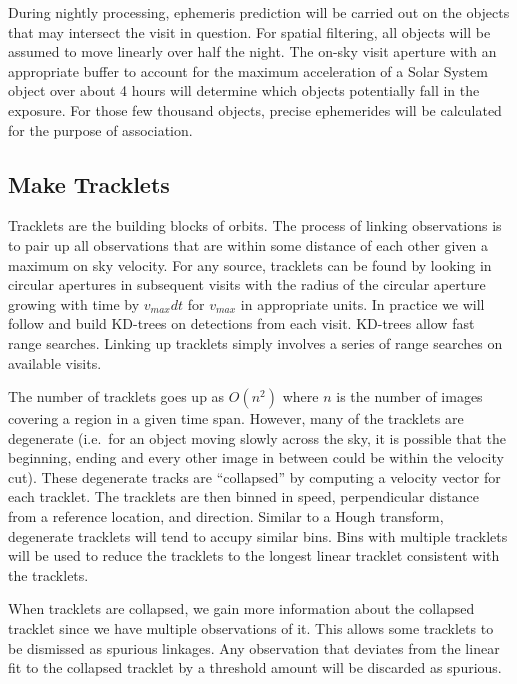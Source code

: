 During nightly processing, ephemeris prediction will be carried out on the objects that may intersect the visit in question.  For spatial filtering, all objects will be assumed to move linearly over half the night.  The on-sky visit aperture with an appropriate buffer to account for the maximum acceleration of a Solar System object over about 4 hours will determine which objects potentially fall in the exposure.  For those few thousand objects, precise ephemerides will be calculated for the purpose of association.

\subsection{Make Tracklets}
\label{sec:acMakeTracklets}
Tracklets are the building blocks of orbits.  The process of linking observations is to pair up all observations that are within some distance of each other given a maximum on sky velocity.  For any source, tracklets can be found by looking in circular apertures in subsequent visits with the radius of the circular aperture growing with time by $v_{max}dt$ for $v_{max}$ in appropriate units.  In practice we will follow \cite{2007ASPC..376..395K} and build KD-trees on detections from each visit.  KD-trees allow fast range searches.  Linking up tracklets simply involves a series of range searches on available visits.

The number of tracklets goes up as $O(n^2)$ where $n$ is the number of images covering a region in a given time span.  However, many of the tracklets are degenerate (i.e.\ for an object moving slowly across the sky, it is possible that the beginning, ending and every other image in between could be within the velocity cut). These degenerate tracks are ``collapsed'' by computing a velocity vector for each tracklet.  The tracklets are then binned in speed, perpendicular distance from a reference location, and direction.  Similar to a Hough transform, degenerate tracklets will tend to accupy similar bins.  Bins with multiple tracklets will be used to reduce the tracklets to the longest linear tracklet consistent with the tracklets.

When tracklets are collapsed, we gain more information about the collapsed tracklet since we have multiple observations of it.  This allows some tracklets to be dismissed as spurious linkages.  Any observation that deviates from the linear fit to the collapsed tracklet by a threshold amount will be discarded as spurious.


